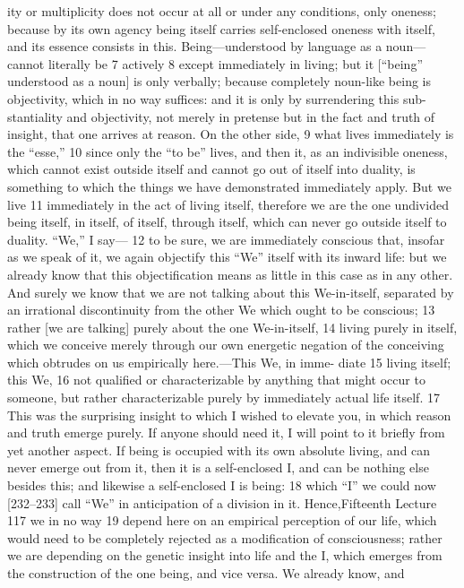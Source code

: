 ity or multiplicity does not occur at all or under any conditions, only oneness;
because by its own agency being itself carries self-enclosed oneness with itself,
and its essence consists in this. Being—understood by language as a noun—
cannot literally be 7 actively 8 except immediately in living; but it [“being”
understood as a noun] is only verbally; because completely noun-like being is
objectivity, which in no way suffices: and it is only by surrendering this sub-
stantiality and objectivity, not merely in pretense but in the fact and truth of
insight, that one arrives at reason.
On the other side, 9 what lives immediately is the “esse,” 10 since only the
“to be” lives, and then it, as an indivisible oneness, which cannot exist outside
itself and cannot go out of itself into duality, is something to which the things
we have demonstrated immediately apply.
But we live 11 immediately in the act of living itself, therefore we are the
one undivided being itself, in itself, of itself, through itself, which can never go
outside itself to duality.
“We,” I say— 12 to be sure, we are immediately conscious that, insofar as
we speak of it, we again objectify this “We” itself with its inward life: but we
already know that this objectification means as little in this case as in any
other. And surely we know that we are not talking about this We-in-itself,
separated by an irrational discontinuity from the other We which ought to be
conscious; 13 rather [we are talking] purely about the one We-in-itself, 14 living
purely in itself, which we conceive merely through our own energetic negation
of the conceiving which obtrudes on us empirically here.—This We, in imme-
diate 15 living itself; this We, 16 not qualified or characterizable by anything that
might occur to someone, but rather characterizable purely by immediately
actual life itself. 17
This was the surprising insight to which I wished to elevate you, in
which reason and truth emerge purely. If anyone should need it, I will point
to it briefly from yet another aspect. If being is occupied with its own absolute
living, and can never emerge out from it, then it is a self-enclosed I, and can
be nothing else besides this; and likewise a self-enclosed I is being: 18 which “I”
we could now [232–233] call “We” in anticipation of a division in it. Hence,Fifteenth Lecture
117
we in no way 19 depend here on an empirical perception of our life, which would
need to be completely rejected as a modification of consciousness; rather we
are depending on the genetic insight into life and the I, which emerges from
the construction of the one being, and vice versa. We already know, and

